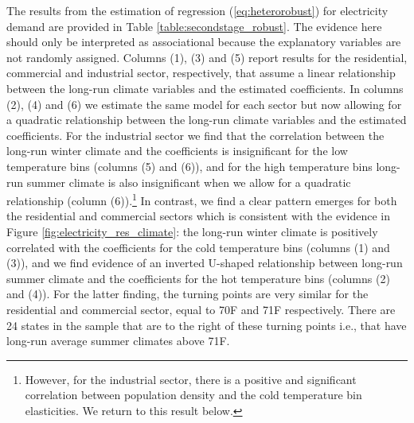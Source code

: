 \documentclass[11pt]{article}
\begin{document}
The results from the estimation of regression (\ref{eq:heterorobust}) for electricity demand are provided in Table \ref{table:secondstage_robust}. The evidence here should only be interpreted as associational because the explanatory variables are not randomly assigned. Columns (1), (3) and (5) report results for the residential, commercial and industrial sector, respectively, that assume a linear relationship between the long-run climate variables and the estimated coefficients. In columns (2), (4) and (6) we estimate the same model for each sector but now allowing for a quadratic relationship between the long-run climate variables and the estimated coefficients. For the industrial sector we find that the correlation between the long-run winter climate and the coefficients is insignificant for the low temperature bins (columns (5) and (6)), and for the high temperature bins long-run summer climate is also insignificant when we allow for a quadratic relationship (column (6)).\footnote{However, for the industrial sector, there is a positive and significant correlation between population density and the cold temperature bin elasticities. We return to this result below.} In contrast, we find a clear pattern emerges for both the residential and commercial sectors which is consistent with the evidence in Figure \ref{fig:electricity_res_climate}: the long-run winter climate is positively correlated with the coefficients for the cold temperature bins (columns (1) and (3)), and we find evidence of an inverted U-shaped relationship between long-run summer climate and the coefficients for the hot temperature bins (columns (2) and (4)). For the latter finding, the turning points are very similar for the residential and commercial sector, equal to 70\degree F and 71\degree F respectively. There are 24 states in the sample that are to the right of these turning points i.e., that have long-run average summer climates above 71\degree F.  
  

\end{document}
